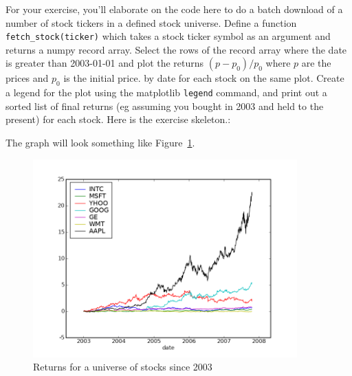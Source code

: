For your exercise, you'll elaborate on the code here to do a batch
download of a number of stock tickers in a defined stock universe.
Define a function \texttt{fetch\_stock(ticker)} which takes a stock
ticker symbol as an argument and returns a numpy record array.  Select
the rows of the record array where the date is greater than 2003-01-01
and plot the returns $(p-p_0)/p_0$ where $p$ are the prices and $p_0$
is the initial price. by date for each stock on the same plot.  Create
a legend for the plot using the matplotlib \texttt{legend} command,
and print out a sorted list of final returns (eg assuming you bought
in 2003 and held to the present) for each stock.  Here is the exercise
skeleton.:



The graph will look something like Figure~\ref{fig:stock_records}.

\begin{center}%
\begin{figure}
\begin{centering}\includegraphics[width=4in]{fig/stock_records}\par\end{centering}


\caption{\label{fig:stock_records}Returns for a universe of stocks
  since 2003}
\end{figure}
\par\end{center}
